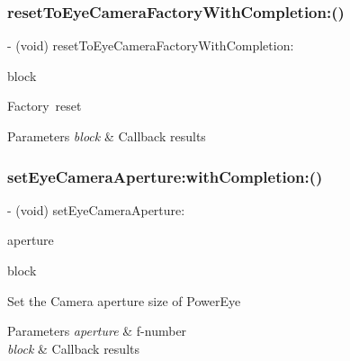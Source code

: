 \subsubsection{\texorpdfstring{reset\+To\+Eye\+Camera\+Factory\+With\+Completion\+:()}{resetToEyeCameraFactoryWithCompletion:()}}
{\footnotesize\ttfamily -\/ (void) reset\+To\+Eye\+Camera\+Factory\+With\+Completion\+: \begin{DoxyParamCaption}\item[{(P\+V\+Completion\+Block)}]{block }\end{DoxyParamCaption}}

Factory reset


\begin{DoxyParams}{Parameters}
{\em block} & Callback results \\
\hline
\end{DoxyParams}
\mbox{\label{interface_p_v_eye_camera_a4a1e42302806409ad3076302efd92fcc}} 
\subsubsection{\texorpdfstring{set\+Eye\+Camera\+Aperture\+:with\+Completion\+:()}{setEyeCameraAperture:withCompletion:()}}
{\footnotesize\ttfamily -\/ (void) set\+Eye\+Camera\+Aperture\+: \begin{DoxyParamCaption}\item[{(P\+V\+Eye\+Camera\+Aperture)}]{aperture }\item[{withCompletion:(P\+V\+Completion\+Block)}]{block }\end{DoxyParamCaption}}

Set the Camera aperture size of Power\+Eye


\begin{DoxyParams}{Parameters}
{\em aperture} & f-\/number \\
\hline
{\em block} & Callback results \\
\hline
\end{DoxyParams}
\mbox{\label{interface_p_v_eye_camera_a5203392ff0bedf8bd288ea5063c9521d}} 

